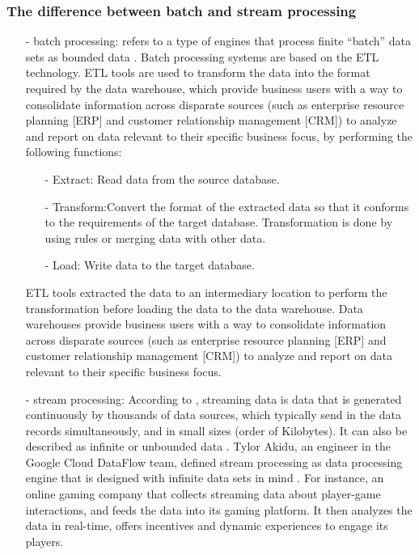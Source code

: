 \subsubsection{The difference between batch and stream processing}
\begin{itemize}
\item[-] batch processing: refers to a type of engines that process finite “batch” data sets as bounded data \cite{a:Akidu}. Batch processing systems are based on the ETL technology. ETL tools are used to transform the data into the format required by the data warehouse, which provide business users with a way to consolidate information across disparate sources (such as enterprise resource planning [ERP] and customer relationship management [CRM]) to analyze and report on data relevant to their specific business focus, by performing the following functions:
\begin{itemize}
\item [-] Extract: Read data from the source database.
\item [-] Transform:Convert the format of the extracted data so that it conforms to the requirements of the target database. Transformation is done by  using rules or merging data with other data.
\item [-] Load: Write data to the target database.
\end{itemize}
 ETL tools extracted the data to an intermediary location to perform the transformation before loading the 
data to the data warehouse.
Data warehouses provide business users with a way to consolidate information across disparate sources (such as enterprise resource planning [ERP] 
and customer relationship management [CRM]) to analyze and report on 
data relevant to their specific business focus.
\item[-] stream processing:
According to \cite{a:amazon}, streaming data is data that is generated continuously by thousands of data sources, which typically send in the data records simultaneously, and in small sizes (order of Kilobytes). It can also be described as infinite or unbounded data \cite{a:Akidu}.
Tylor Akidu, an engineer in the Google Cloud DataFlow team, defined stream processing as data processing engine that is designed with infinite data sets in mind \cite{a:Akidu}. For instance, an online gaming company that collects streaming data about player-game interactions, and feeds the data into its gaming platform. It then analyzes the data in real-time, offers incentives and dynamic experiences to engage its players.
\end{itemize}
